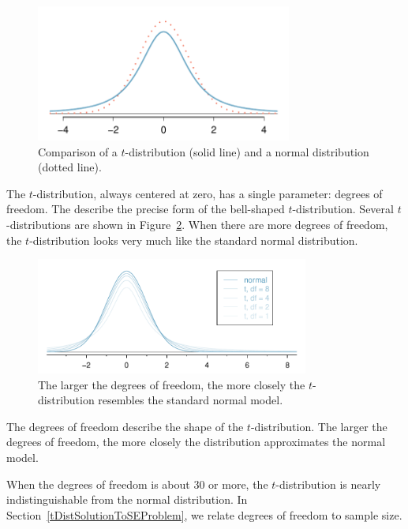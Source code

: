 \begin{figure}
\centering
\includegraphics[height=45mm]{ch_inference_for_means/figures/tDistCompareToNormalDist/tDistCompareToNormalDist}
\caption{Comparison of a $t$-distribution (solid line) and a normal distribution (dotted line).}
\label{tDistCompareToNormalDist}
\end{figure}

The $t$-distribution, always centered at zero, has a single parameter: degrees of freedom. The  describe the precise form of the bell-shaped $t$-distribution. Several $t$-distributions are shown in Figure~\ref{tDistConvergeToNormalDist}. When there are more degrees of freedom, the $t$-distribution looks very much like the standard normal distribution.

\begin{figure}
\centering
\includegraphics[width=0.8\textwidth]{ch_inference_for_means/figures/tDistConvergeToNormalDist/tDistConvergeToNormalDist}
\caption{The larger the degrees of freedom, the more closely the $t$-distribution resembles the standard normal model.}
\label{tDistConvergeToNormalDist}
\end{figure}

\begin{termBox}{
The degrees of freedom describe the shape of the $t$-distribution. The larger the degrees of freedom, the more closely the distribution approximates the normal model.}
\end{termBox}

When the degrees of freedom is about 30 or more, the $t$-distribution is nearly indistinguishable from the normal distribution. In Section~\ref{tDistSolutionToSEProblem}, we relate degrees of freedom to sample size.

